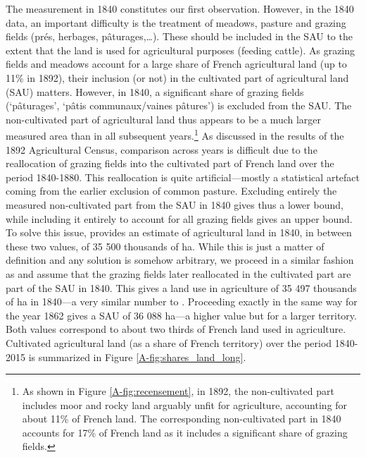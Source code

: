 \documentclass[11pt]{report}
\begin{document}
The measurement in 1840 constitutes our first observation. However, in the 1840 data, an important difficulty is the treatment of meadows, pasture and grazing fields (prés, herbages, pâturages,…). These should be included in the SAU to the extent that the land is used for agricultural purposes (feeding cattle). As grazing fields and meadows account for a large share of French agricultural land (up to 11\% in 1892), their inclusion (or not) in the cultivated part of agricultural land (SAU) matters. However, in 1840, a significant share of grazing fields (`pâturages', `pâtis communaux/vaines pâtures') is excluded from the SAU. The non-cultivated part of agricultural land thus appears to be a much larger measured area than in all subsequent years.\footnote{As shown in Figure \ref{A-fig:recensement}, in 1892, the non-cultivated part includes moor and rocky land arguably unfit for agriculture, accounting for about 11\% of French land. The corresponding non-cultivated part in 1840 accounts for 17\% of French land as it includes a significant share of grazing fields.} As discussed in the results of the 1892 Agricultural Census, comparison across years is difficult due to the reallocation of grazing fields into the cultivated part of French land over the period 1840-1880. This reallocation is quite artificial---mostly a statistical artefact coming from the earlier exclusion of common pasture. Excluding entirely the measured non-cultivated part from the SAU in 1840 gives thus a lower bound, while including it entirely to account for all grazing fields gives an upper bound. To solve this issue, \cite{toutain1993production} provides an estimate of agricultural land in 1840, in between these two values, of 35 500 thousands of ha. While this is just a matter of definition and any solution is somehow arbitrary, we proceed in a similar fashion as \cite{toutain1993production} and assume that the grazing fields later reallocated in the cultivated part are part of the SAU in 1840. This gives a land use in agriculture of 35 497 thousands of ha in 1840---a very similar number to \cite{toutain1993production}. Proceeding exactly in the same way for the year 1862 gives a SAU of 36 088 ha---a higher value but for a larger territory. Both values correspond to about two thirds of French land used in agriculture. Cultivated agricultural land (as a share of French territory) over the period 1840-2015 is summarized in Figure \ref{A-fig:shares_land_long}.
\end{document}
